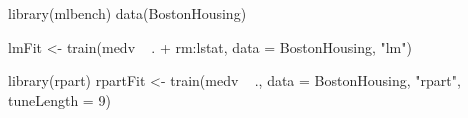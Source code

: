 
library(mlbench)
data(BostonHousing)
 
lmFit <- train(medv ~ . + rm:lstat,
               data = BostonHousing, 
               "lm")
 
library(rpart)
rpartFit <- train(medv ~ .,
                  data = BostonHousing,
                  "rpart",
                  tuneLength = 9)
                  
                  
